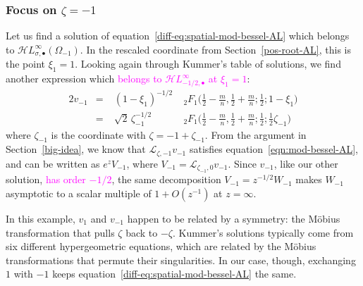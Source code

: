 \documentclass{article}
\newcommand{\singexp}[2]{\mathcal{H}L^\infty_{#1, #2}}
\newcommand{\singexpalg}[1]{\singexp{#1}{\bullet}}
\newcommand{\laplace}{\mathcal{L}}
\theoremstyle{definition}
\theoremstyle{plain}
\begin{document}
\subsubsection{Focus on $\zeta = -1$}\label{neg-root-AL}
Let us find a solution of equation~\eqref{diff-eq:spatial-mod-bessel-AL} which belongs to $\singexpalg{\sigma}(\Omega_{-1})$. In the rescaled coordinate from Section~\ref{pos-root-AL}, this is the point $\xi_1 = 1$. Looking again through Kummer's table of solutions, we find another expression \cite[formula~15.10.14]{dlmf} which \textcolor{magenta}{belongs to $\singexpalg{-1/2}$ at $\xi_1 = 1$}:
\begin{alignat*}{2}
v_{-1} &=\;& (1-\xi_1)^{-1/2} &\;{}_2F_1\big(\tfrac{1}{2}-\tfrac{m}{n}, \tfrac{1}{2}+\tfrac{m}{n}; \tfrac{1}{2}; 1-\xi_1\big) \\[1mm]
&=\;& \sqrt{2}\,\zeta_{-1}^{-1/2} &\;{}_2F_1\big(\tfrac{1}{2}-\tfrac{m}{n}, \tfrac{1}{2}+\tfrac{m}{n}; \tfrac{1}{2}; \tfrac{1}{2}\zeta_{-1}\big)
\end{alignat*}
where $\zeta_{-1}$ is the coordinate with $\zeta = -1 + \zeta_{-1}$. From the argument in Section~\ref{big-idea}, we know that $\laplace_{\zeta, -1} v_{-1}$ satisfies equation~\eqref{eqn:mod-bessel-AL}, and can be written as $e^z V_{-1}$, where $V_{-1} = \laplace_{\zeta_{-1}, 0} v_{-1}$. Since $v_{-1}$, like our other solution, \textcolor{magenta}{has order $-1/2$}, the same decomposition $V_{-1} = z^{-1/2} W_{-1}$ makes $W_{-1}$ asymptotic to a scalar multiple of $1+O(z^{-1})$ at $z = \infty$.

In this example, $v_1$ and $v_{-1}$ happen to be related by a symmetry: the M\"{o}bius transformation that pulls $\zeta$ back to $-\zeta$. Kummer's solutions typically come from six different hypergeometric equations, which are related by the M\"{o}bius transformations that permute their singularities. In our case, though, exchanging $1$ with $-1$ keeps equation~\eqref{diff-eq:spatial-mod-bessel-AL} the same.
\end{document}
